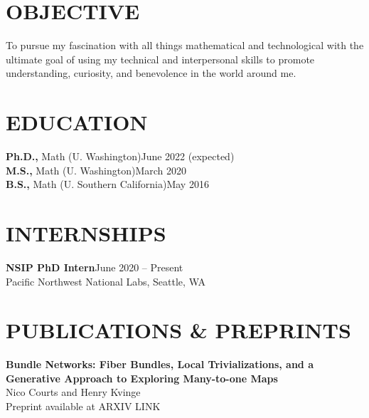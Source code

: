 \documentclass[margin]{res} %
\begin{document}
\begin{resume}

 
\section{OBJECTIVE}  

To pursue my fascination with all things mathematical and technological with the ultimate goal of using my 
technical and interpersonal skills to promote understanding, curiosity, and benevolence in the world around me.


\section{EDUCATION}

{\bf Ph.D.,} Math (U. Washington)\hfill June 2022 (expected) \\
{\bf M.S.,} Math (U. Washington)\hfill March 2020 \\
{\bf B.S.,} Math (U. Southern California)\hfill May 2016 


 
\section{INTERNSHIPS}
\textbf{NSIP PhD Intern}\hfill June 2020 -- Present\\
Pacific Northwest National Labs, Seattle, WA

\section{PUBLICATIONS \& PREPRINTS}
\textbf{Bundle Networks: Fiber Bundles, Local Trivializations, and a Generative Approach to Exploring Many-to-one Maps}\\
Nico Courts and Henry Kvinge\\
Preprint available at ARXIV LINK


\end{resume}
\end{document}
